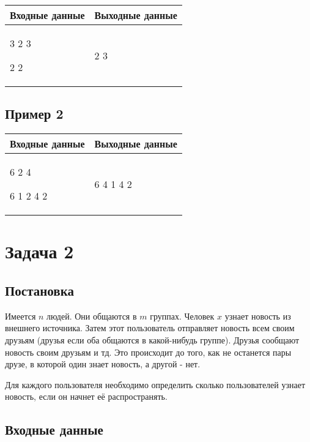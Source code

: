 \documentclass{extarticle}
\begin{document}
\begin{table}[H]
\begin{center}
\begin{tabular}{|m{4cm}|m{4cm}|}
\hline
Входные данные & Выходные данные \\ \hline
3 2 3

2 2
&
2 3
\\ \hline
\end{tabular}
\end{center}
\end{table}

\subsection*{Пример 2}
\label{sec:orgff57af7}

\begin{table}[H]
\begin{center}
\begin{tabular}{|m{4cm}|m{4cm}|}
\hline
Входные данные & Выходные данные \\ \hline
6 2 4

6 1 2 4 2
&
6 4 1 4 2
\\ \hline
\end{tabular}
\end{center}
\end{table}

\pagebreak
\section*{Задача 2}
\label{sec:org43bde00}
\subsection*{Постановка}
\label{sec:org3a05786}

Имеется \(n\) людей. Они общаются в \(m\) группах.
Человек \(x\) узнает новость из внешнего источника.
Затем этот пользователь отправляет новость всем своим друзьям
(друзья если оба общаются в какой-нибудь группе).
Друзья сообщают новость своим друзьям и тд.
Это происходит до того, как не останется пары друзе, в которой один
знает новость, а другой - нет.

Для каждого пользователя необходимо определить сколько пользователей узнает
новость, если он начнет её распространять.

\subsection*{Входные данные}
\label{sec:orge20f425}
\end{document}
